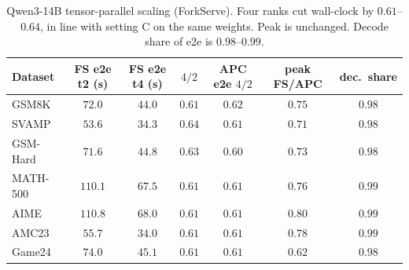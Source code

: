 \documentclass[11pt,a4paper]{article}
\begin{document}
\begin{table}[h]
\centering
\small
{}
\caption{Qwen3-14B fan-out and winner decode tokens.
Fan-out is $1.2$--$1.9\times$ APC and still $<3\%$ of $T_{\mathrm{e2e}}$.
APC always spends the decode budget; ForkServe stops early on GSM8K and SVAMP.}
\end{table}

\begin{table}[h]
\centering
\small
\begin{tabular}{@{}lcccccc@{}}
\toprule
Dataset & FS e2e t2 (s) & FS e2e t4 (s) & $4/2$ & APC e2e $4/2$ & peak FS/APC & dec.\ share \\
\midrule
GSM8K    & $72.0$ & $44.0$ & $0.61$ & $0.62$ & $0.75$ & $0.98$ \\
SVAMP    & $53.6$ & $34.3$ & $0.64$ & $0.61$ & $0.71$ & $0.98$ \\
GSM-Hard & $71.6$ & $44.8$ & $0.63$ & $0.60$ & $0.73$ & $0.98$ \\
MATH-500 & $110.1$ & $67.5$ & $0.61$ & $0.61$ & $0.76$ & $0.99$ \\
AIME     & $110.8$ & $68.0$ & $0.61$ & $0.61$ & $0.80$ & $0.99$ \\
AMC23    & $55.7$ & $34.0$ & $0.61$ & $0.61$ & $0.78$ & $0.99$ \\
Game24   & $74.0$ & $45.1$ & $0.61$ & $0.61$ & $0.62$ & $0.98$ \\
\bottomrule
\end{tabular}
\caption{Qwen3-14B tensor-parallel scaling (ForkServe).
Four ranks cut wall-clock by $0.61$--$0.64$, in line with setting C on the same weights.
Peak is unchanged.
Decode share of e2e is $0.98$--$0.99$.}
\end{table}
\end{document}
